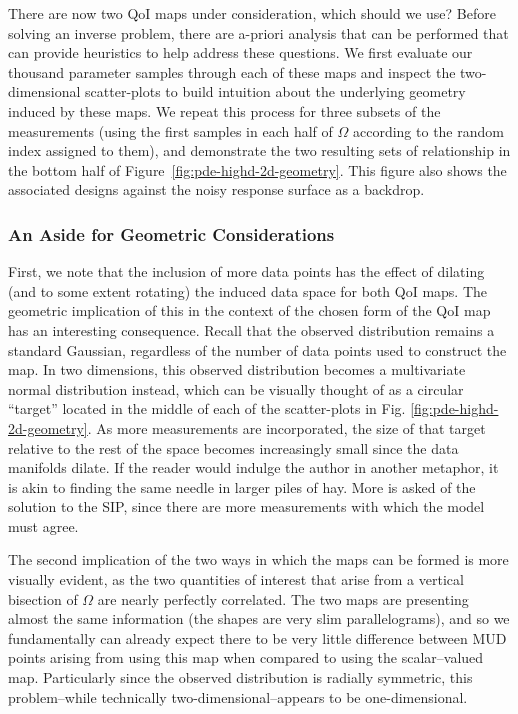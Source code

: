 There are now two QoI maps under consideration, which should we use?
Before solving an inverse problem, there are a-priori analysis that can be performed that can provide heuristics to help address these questions.
We first evaluate our thousand parameter samples through each of these maps and inspect the two-dimensional scatter-plots to build intuition about the underlying geometry induced by these maps.
We repeat this process for three subsets of the measurements (using the first samples in each half of $\Omega$ according to the random index assigned to them), and demonstrate the two resulting sets of relationship in the bottom half of Figure~\ref{fig:pde-highd-2d-geometry}.
This figure also shows the associated designs against the noisy response surface as a backdrop.

\subsubsection{An Aside for Geometric Considerations}

First, we note that the inclusion of more data points has the effect of dilating (and to some extent rotating) the induced data space for both QoI maps.
The geometric implication of this in the context of the chosen form of the QoI map has an interesting consequence.
Recall that the observed distribution remains a standard Gaussian, regardless of the number of data points used to construct the map.
In two dimensions, this observed distribution becomes a multivariate normal distribution instead, which can be visually thought of as a circular ``target'' located in the middle of each of the scatter-plots in Fig. \ref{fig:pde-highd-2d-geometry}.
As more measurements are incorporated, the size of that target relative to the rest of the space becomes increasingly small since the data manifolds dilate.
If the reader would indulge the author in another metaphor, it is akin to finding the same needle in larger piles of hay.
More is asked of the solution to the SIP, since there are more measurements with which the model must agree.

The second implication of the two ways in which the maps can be formed is more visually evident, as the two quantities of interest that arise from a vertical bisection of $\Omega$ are nearly perfectly correlated.
The two maps are presenting almost the same information (the shapes are very slim parallelograms), and so we fundamentally can already expect there to be very little difference between MUD points arising from using this map when compared to using the scalar--valued map.
Particularly since the observed distribution is radially symmetric, this problem\---while technically two-dimensional\---appears to be one-dimensional.

